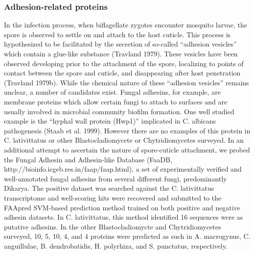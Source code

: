 \subsubsection*{Adhesion-related proteins}
In the infection process, when biflagellate zygotes encounter mosquito larvae, the spore is observed to settle on and attach to the host cuticle. This process is hypothesized to be facilitated by the secretion of so-called “adhesion vesicles” which contain a glue-like substance (Travland 1979). These vesicles have been observed developing prior to the attachment of the spore, localizing to points of contact between the spore and cuticle, and disappearing after host penetration (Travland 1979b). While the chemical nature of these “adhesion vesicles” remains unclear, a number of candidates exist. Fungal adhesins, for example, are membrane proteins which allow certain fungi to attach to surfaces and are usually involved in microbial community biofilm formation. One well studied example is the “hyphal wall protein (Hwp1)” implicated in C. albicans pathogenesis (Staab et al. 1999). However there are no examples of this protein in C. lativittatus or other Blastocladiomycete or Chytridiomycetes surveyed. In an additional attempt to ascertain the nature of spore-cuticle attachment, we probed the Fungal Adhesin and Adhesin-like Database (FaaDB, http://bioinfo.icgeb.res.in/faap/faap.html), a set of experimentally verified and well-annotated fungal adhesins from several different fungi, predominantly Dikarya. The positive dataset was searched against the C. lativittatus transcriptome and well-scoring hits were recovered and submitted to the FAApred SVM-based prediction method trained on both positive and negative adhesin datasets. In C. lativittatus, this method identified 16 sequences were as putative adhesins. In the other Blastocladiomycte and Chytridiomycetes surveyed, 10, 5, 10, 4, and 4 proteins were predicted as such in A. macrogynus, C. anguillulae, B. dendrobatidis, H. polyrhiza, and S. punctatus, respectively. 
